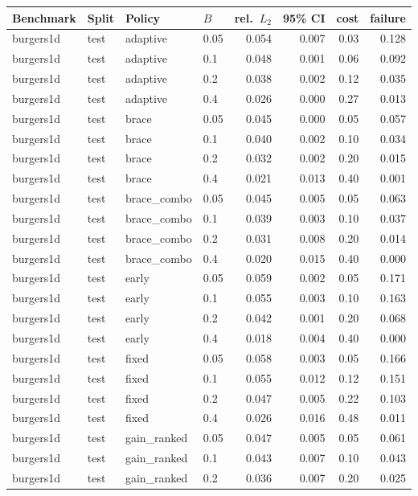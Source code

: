 \begin{tabular}{llllrrrr}
\toprule
Benchmark & Split & Policy & $B$ & rel.\ $L_2$ & 95\% CI & cost & failure \\
\midrule
burgers1d & test & adaptive & 0.05 & 0.054 & 0.007 & 0.03 & 0.128 \\
burgers1d & test & adaptive & 0.1 & 0.048 & 0.001 & 0.06 & 0.092 \\
burgers1d & test & adaptive & 0.2 & 0.038 & 0.002 & 0.12 & 0.035 \\
burgers1d & test & adaptive & 0.4 & 0.026 & 0.000 & 0.27 & 0.013 \\
burgers1d & test & brace & 0.05 & 0.045 & 0.000 & 0.05 & 0.057 \\
burgers1d & test & brace & 0.1 & 0.040 & 0.002 & 0.10 & 0.034 \\
burgers1d & test & brace & 0.2 & 0.032 & 0.002 & 0.20 & 0.015 \\
burgers1d & test & brace & 0.4 & 0.021 & 0.013 & 0.40 & 0.001 \\
burgers1d & test & brace\_combo & 0.05 & 0.045 & 0.005 & 0.05 & 0.063 \\
burgers1d & test & brace\_combo & 0.1 & 0.039 & 0.003 & 0.10 & 0.037 \\
burgers1d & test & brace\_combo & 0.2 & 0.031 & 0.008 & 0.20 & 0.014 \\
burgers1d & test & brace\_combo & 0.4 & 0.020 & 0.015 & 0.40 & 0.000 \\
burgers1d & test & early & 0.05 & 0.059 & 0.002 & 0.05 & 0.171 \\
burgers1d & test & early & 0.1 & 0.055 & 0.003 & 0.10 & 0.163 \\
burgers1d & test & early & 0.2 & 0.042 & 0.001 & 0.20 & 0.068 \\
burgers1d & test & early & 0.4 & 0.018 & 0.004 & 0.40 & 0.000 \\
burgers1d & test & fixed & 0.05 & 0.058 & 0.003 & 0.05 & 0.166 \\
burgers1d & test & fixed & 0.1 & 0.055 & 0.012 & 0.12 & 0.151 \\
burgers1d & test & fixed & 0.2 & 0.047 & 0.005 & 0.22 & 0.103 \\
burgers1d & test & fixed & 0.4 & 0.026 & 0.016 & 0.48 & 0.011 \\
burgers1d & test & gain\_ranked & 0.05 & 0.047 & 0.005 & 0.05 & 0.061 \\
burgers1d & test & gain\_ranked & 0.1 & 0.043 & 0.007 & 0.10 & 0.043 \\
burgers1d & test & gain\_ranked & 0.2 & 0.036 & 0.007 & 0.20 & 0.025 \\

\end{tabular}
